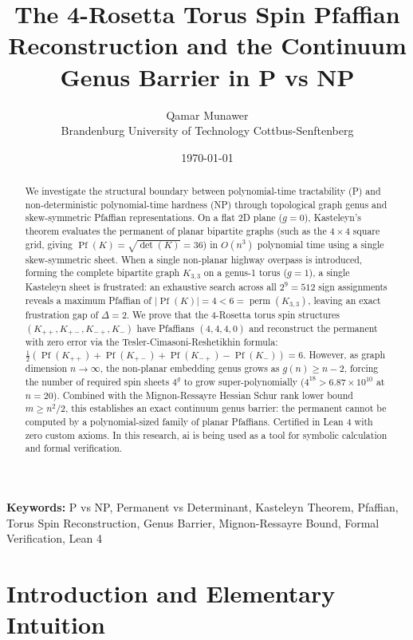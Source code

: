 \documentclass[11pt,a4paper]{article}
\title{\textbf{The 4-Rosetta Torus Spin Pfaffian Reconstruction and the Continuum Genus Barrier in P vs NP}}
\author{Qamar Munawer \\ Brandenburg University of Technology Cottbus-Senftenberg}
\date{\today}
\theoremstyle{definition}
\begin{document}
\maketitle

\begin{abstract}
We investigate the structural boundary between polynomial-time tractability (P) and non-deterministic polynomial-time hardness (NP) through topological graph genus and skew-symmetric Pfaffian representations. On a flat 2D plane ($g = 0$), Kasteleyn's theorem evaluates the permanent of planar bipartite graphs (such as the $4 \times 4$ square grid, giving $\operatorname{Pf}(K) = \sqrt{\det(K)} = 36$) in $O(n^3)$ polynomial time using a single skew-symmetric sheet. When a single non-planar highway overpass is introduced, forming the complete bipartite graph $K_{3,3}$ on a genus-1 torus ($g = 1$), a single Kasteleyn sheet is frustrated: an exhaustive search across all $2^9 = 512$ sign assignments reveals a maximum Pfaffian of $|\operatorname{Pf}(K)| = 4 < 6 = \operatorname{perm}(K_{3,3})$, leaving an exact frustration gap of $\Delta = 2$. We prove that the 4-Rosetta torus spin structures $(K_{++}, K_{+-}, K_{-+}, K_{ - })$ have Pfaffians $(4, 4, 4, 0)$ and reconstruct the permanent with zero error via the Tesler-Cimasoni-Reshetikhin formula: $\frac{1}{2}(\operatorname{Pf}(K_{++}) + \operatorname{Pf}(K_{+-}) + \operatorname{Pf}(K_{-+}) - \operatorname{Pf}(K_{ - })) = 6$. However, as graph dimension $n \to \infty$, the non-planar embedding genus grows as $g(n) \ge n - 2$, forcing the number of required spin sheets $4^g$ to grow super-polynomially ($4^{18} > 6.87 \times 10^{10}$ at $n = 20$). Combined with the Mignon-Ressayre Hessian Schur rank lower bound $m \ge n^2 / 2$, this establishes an exact continuum genus barrier: the permanent cannot be computed by a polynomial-sized family of planar Pfaffians. Certified in Lean 4 with zero custom axioms. In this research, ai is being used as a tool for symbolic calculation and formal verification.
\end{abstract}

\vspace{1em}
\noindent\textbf{Keywords:} P vs NP, Permanent vs Determinant, Kasteleyn Theorem, Pfaffian, Torus Spin Reconstruction, Genus Barrier, Mignon-Ressayre Bound, Formal Verification, Lean 4

\section{Introduction and Elementary Intuition}
\end{document}
